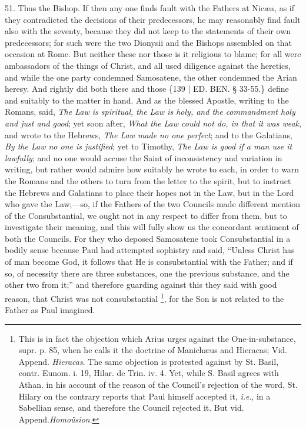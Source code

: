 51. Thus the Bishop. If then
any one finds fault with the Fathers at Nicæa, as if they
contradicted the decisions of their predecessors, he may reasonably
find fault also with the seventy, because they did not keep to the
statements of their own predecessors; for such were the two Dionysii
and the Bishops assembled on that occasion at Rome. But neither these
nor those is it religious to blame; for all were ambassadors of the
things of Christ, and all used diligence against the heretics, and
while the one party condemned Samosatene, the other condemned the
Arian heresy. And rightly did both these and those \{139 | ED. BEN.
§ 33-55.\} define and suitably to the matter in hand. And as the
blessed Apostle, writing to the Romans, said, \emph{The Law is spiritual,
the Law is holy, and the commandment holy and just and good}; yet
soon after, \emph{What the Law could not do, in that it was weak}, and
wrote to the Hebrews, \emph{The Law made no one perfect}; and to the
Galatians, \emph{By the Law no one is justified}; yet to Timothy, \emph{The
Law is good if a man use it lawfully}; and no one would accuse the
Saint of inconsistency and variation in writing, but rather would
admire how suitably he wrote to each, in order to warn the Romans and
the others to turn from the letter to the spirit, but to instruct the
Hebrews and Galatians to place their hopes not in the Law, but in the
Lord who gave the Law;—so, if the Fathers of the two Councils made
different mention of the Consubstantial, we ought not in any respect
to differ from them, but to investigate their meaning, and this will
fully show us the concordant sentiment of both the Councils. For they
who deposed Samosatene took Consubstantial in a bodily sense because
Paul had attempted sophistry and said, ``Unless Christ has of man
become God, it follows that He is consubstantial with the Father; and
if so, of necessity there are three substances, one the previous
substance, and the other two from it;'' and therefore guarding against
this they said with good reason, that Christ was not consubstantial \footnote{This is in fact the objection which Arius urges against the
One-in-substance, supr. p. 85, when he calls it the doctrine of Manichæus
and Hieracas; Vid. Append. \emph{Hieracas}. The same objection is
protested against by St. Basil, contr. Eunom. i. 19, Hilar. de Trin.
iv. 4. Yet, while S. Basil agrees with Athan. in his account of the
reason of the Council's rejection of the word, St. Hilary on the
contrary reports that Paul himself accepted it, \emph{i.e}., in a
Sabellian sense, and therefore the Council rejected it. But vid. Append.\emph{Homoüsion}.}, for the Son is not related to the Father as Paul imagined.
